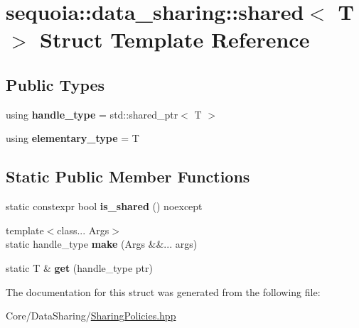 \hypertarget{structsequoia_1_1data__sharing_1_1shared}{}\section{sequoia\+::data\+\_\+sharing\+::shared$<$ T $>$ Struct Template Reference}
\label{structsequoia_1_1data__sharing_1_1shared}
\subsection*{Public Types}
\begin{DoxyCompactItemize}
\item 
\mbox{\label{structsequoia_1_1data__sharing_1_1shared_a3cb63ff7dfb02b8c0f353e10935b497a}} 
using {\bfseries handle\+\_\+type} = std\+::shared\+\_\+ptr$<$ T $>$
\item 
\mbox{\label{structsequoia_1_1data__sharing_1_1shared_ada8e41be0a357d9317623d4c646cceee}} 
using {\bfseries elementary\+\_\+type} = T
\end{DoxyCompactItemize}
\subsection*{Static Public Member Functions}
\begin{DoxyCompactItemize}
\item 
\mbox{\label{structsequoia_1_1data__sharing_1_1shared_adb4d74e0475680a158ccdf408509a28d}} 
static constexpr bool {\bfseries is\+\_\+shared} () noexcept
\item 
\mbox{\label{structsequoia_1_1data__sharing_1_1shared_af685dad13cf8271c0b4b5d2400df10da}} 
{\footnotesize template$<$class... Args$>$ }\\static handle\+\_\+type {\bfseries make} (Args \&\&... args)
\item 
\mbox{\label{structsequoia_1_1data__sharing_1_1shared_a0cc0db30b0e5ed74df8fedc10d056cbd}} 
static T \& {\bfseries get} (handle\+\_\+type ptr)
\end{DoxyCompactItemize}


The documentation for this struct was generated from the following file\+:\begin{DoxyCompactItemize}
\item 
Core/\+Data\+Sharing/\mbox{\hyperlink{_sharing_policies_8hpp}{Sharing\+Policies.\+hpp}}\end{DoxyCompactItemize}
